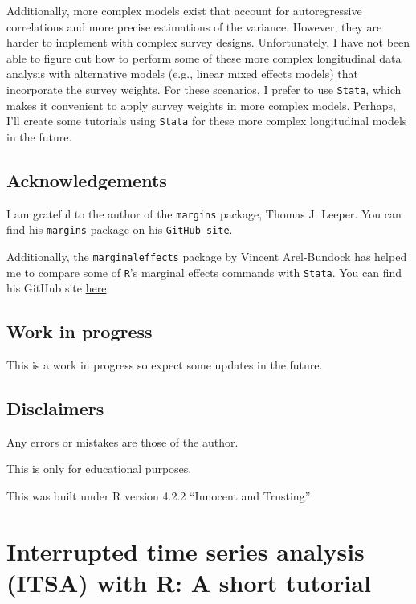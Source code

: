 \documentclass[
]{book}
\begin{document}
Additionally, more complex models exist that account for autoregressive correlations and more precise estimations of the variance. However, they are harder to implement with complex survey designs. Unfortunately, I have not been able to figure out how to perform some of these more complex longitudinal data analysis with alternative models (e.g., linear mixed effects models) that incorporate the survey weights. For these scenarios, I prefer to use \texttt{Stata}, which makes it convenient to apply survey weights in more complex models. Perhaps, I'll create some tutorials using \texttt{Stata} for these more complex longitudinal models in the future.

\hypertarget{acknowledgements-4}{%
\section{Acknowledgements}\label{acknowledgements-4}}

I am grateful to the author of the \texttt{margins} package, Thomas J. Leeper. You can find his \texttt{margins} package on his \href{https://github.com/leeper/margins}{\texttt{GitHub\ site}}.

Additionally, the \texttt{marginaleffects} package by Vincent Arel-Bundock has helped me to compare some of \texttt{R}'s marginal effects commands with \texttt{Stata}. You can find his GitHub site \href{https://github.com/vincentarelbundock/marginaleffects}{here}.

\hypertarget{work-in-progress-1}{%
\section{Work in progress}\label{work-in-progress-1}}

This is a work in progress so expect some updates in the future.

\hypertarget{disclaimers-1}{%
\section{Disclaimers}\label{disclaimers-1}}

Any errors or mistakes are those of the author.

This is only for educational purposes.

This was built under R version 4.2.2 ``Innocent and Trusting''

\hypertarget{itsa}{%
\chapter{Interrupted time series analysis (ITSA) with R: A short tutorial}\label{itsa}}
\end{document}
